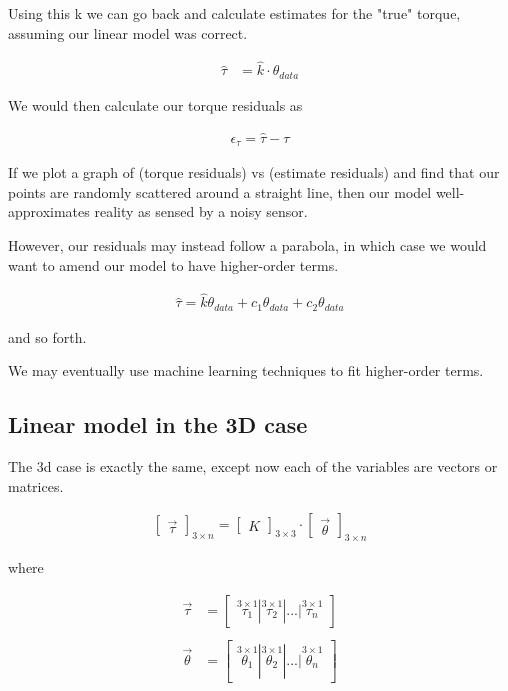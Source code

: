 \documentclass[preprint,12pt,3p]{elsarticle}
\begin{document}
Using this k we can go back and calculate estimates for the "true" torque, assuming our linear model was correct.

\begin{align}
 \hat{\tau} &= \hat{k} \cdot \theta_{data} 
\end{align}

We would then calculate our torque residuals as

\begin{align}
 \epsilon_{\tau} = \hat{\tau} - \tau 
\end{align}

If we plot a graph of (torque residuals) vs (estimate residuals) and find that our points are randomly scattered around a straight line, then our model well-approximates reality as sensed by a noisy sensor.

However, our residuals may instead follow a parabola, in which case we would want to amend our model
to have higher-order terms.

\begin{align}
 \hat{\tau} = \hat{k}\theta_{data} +c_1 \theta_{data} + c_2 \theta_{data}
\end{align}

and so forth. 

We may eventually use machine learning techniques to fit higher-order terms.

\subsection{Linear model in the 3D case}
\label{3d case}
The 3d case is exactly the same, except now each of the variables are vectors or matrices. 

\begin{align}
    \begin{bmatrix} \vec{\tau} \end{bmatrix}_{3\times n}  = \begin{bmatrix} K \end{bmatrix}_{3\times 3} \cdot \begin{bmatrix} \vec{\theta} \end{bmatrix}_{3\times n} 
\end{align}

where

\begin{align}
\vec{\tau} &= \begin{bmatrix} \stackrel{3\times 1}{\tau_1} | \stackrel{3\times 1}{\tau_2} | ... |\stackrel{3\times 1}{\tau_n} \end{bmatrix} \\
\\
\vec{\theta} &= \begin{bmatrix} \stackrel{3\times 1}{\theta_1} | \stackrel{3\times 1}{\theta_2} | ... |\stackrel{3\times 1}{\theta_n} \end{bmatrix}
\end{align}
\end{document}
